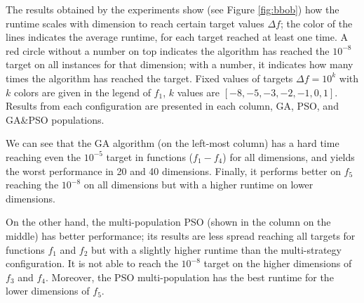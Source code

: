 \documentclass[runningheads]{llncs}
\begin{document}
The results obtained by the experiments show (see Figure \ref{fig:bbob}) how
the runtime scales with dimension to reach certain target values $\Delta f$;
the color of the lines indicates the average runtime, for each target reached
at least one time. A red circle without a number on top indicates the algorithm
has reached the $10^{-8}$ target on all instances for that dimension;
with a number, it indicates how many times the algorithm has reached
the target. Fixed values of targets $\Delta f = 10^{k}$ with $k$ colors are
given in the legend of $f_1$, $k$ values are $[-8,-5,-3,-2,-1,0,1]$. Results
from each configuration are presented in each column, GA, PSO, and GA\&PSO
populations.

We can see that the GA algorithm (on the left-most column) has a hard time reaching even the
$10^{-5}$ target in functions ($f_1-f_4$) for all dimensions, and yields the worst
performance in 20 and 40 dimensions. Finally, it performs better on $f_5$
reaching the $10^{-8}$ on all dimensions but with a higher runtime on lower
dimensions. %

On the other hand, the multi-population PSO (shown in the column on the middle)
has better performance; its results are less spread
reaching all targets for functions $f_1$ and $f_2$ but with a slightly higher
runtime than the multi-strategy configuration. It is not able to reach the
$10^{-8}$ target on the higher dimensions of $f_3$ and $f_4$. Moreover, the PSO
multi-population has the best runtime for the lower dimensions of $f_5$.
\end{document}
